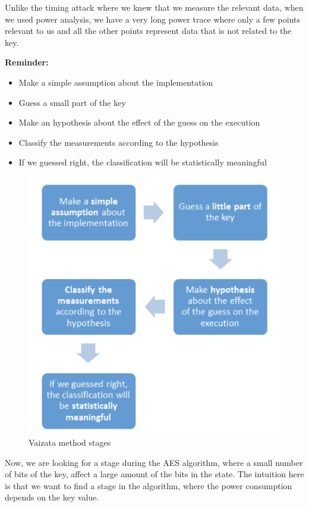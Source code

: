 Unlike the timing attack where we knew that we measure the relevant data, when we used power analysis, we have a very long power trace where only a few points relevant to us and all the other points represent data that is not related to the key.

\textbf{Reminder:}

\begin{itemize}
\item Make a {simple assumption} about the implementation
\item Guess a {small part} of the key
\item Make an {hypothesis} about the effect of the guess on the execution
\item {Classify the measurements} according to the hypothesis
\item If we guessed right, the classification will be {statistically meaningful}
\end{itemize}

\begin{figure}[!ht]
    \centering
    \includegraphics[height=0.9\textwidth]{images/Lecture6/vaizata.png}
    \caption{Vaizata method stages} \label{fig:vaizata}
\end{figure}

Now, we are looking for a stage during the AES algorithm, where a small number of bits of the key, affect a large amount of the bits in the state. 
The intuition here is that we want to find a stage in the algorithm, where the power consumption depends on the key value.

